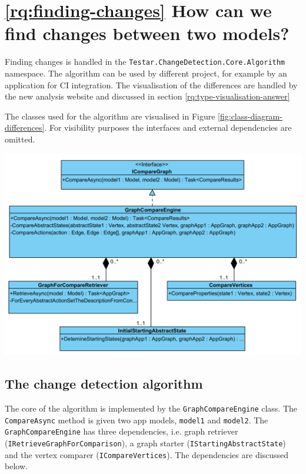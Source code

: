 \section{\ref{rq:finding-changes} How can we find changes between two models?}

Finding changes is handled in the \verb|Testar.ChangeDetection.Core.Algorithm| namespace. The algorithm can be used by different project, for example by an application for CI integration. The visualisation of the differences are handled by the new analysis website and discussed in section \ref{rq:type-visualisation-answer}

The classes used for the algorithm are visualised in Figure \ref{fig:class-diagram-differences}. For visibility purposes the interfaces and external dependencies are omitted.

\begingroup
\captionsetup{type=figure}
\includegraphics[scale=0.5]{thesis/images/4-UML-Differences.png}
\label{fig:class-diagram-differences}
\endgroup

\subsection{The change detection algorithm}

The core of the algorithm is implemented by the \verb|GraphCompareEngine| class. The \verb|CompareAsync| method is given two app models, \verb|model1| and \verb|model2|. The \verb|GraphCompareEngine| has three dependencies, i.e. graph retriever (\verb|IRetrieveGraphForComparison|), a graph starter (\verb|IStartingAbstractState|) and the vertex comparer (\verb|ICompareVertices|). The dependencies are discussed below. 

